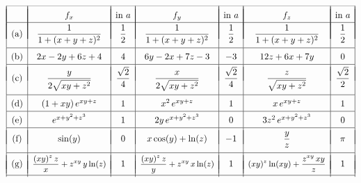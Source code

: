 \begin{Answer}\\
    \vspace{-0.65cm}
    $\renewcommand{\arraystretch}{1.5}\begin{array}{|c|c|c|c|c|c|c|}
    &&&&&&\vspace{-0.77cm}\\
    \hline
    &&&&&&\vspace{-0.6cm}\\
    & f_x & \mbox{in } a  & f_y & \mbox{in } a & f_z & \mbox{in } a   \\
    &&&&&&\vspace{-0.65cm}\\
    \hline
    &&&&&&\vspace{-0.55cm}\\
    \mbox{(a)} & \dfrac{1}{1+(x+y+z)^2} & \dfrac{1}{2} & \dfrac{1}{1+(x+y+z)^2} & \dfrac{1}{2}  & \dfrac{1}{1+(x+y+z)^2} & \dfrac{1}{2} \\[0.25cm]
    \hline
    \mbox{(b)} & 2x-2y+6z+4 & 4 & 6y-2x+7z-3 & -3  & 12z+6x+7y & 0  \\ 
    \hline
    &&&&&&\vspace{-0.55cm}\\
    \mbox{(c)} & \dfrac{y}{2\sqrt{xy+z^2}} & \dfrac{\sqrt{2}}{4} & \dfrac{x}{2\sqrt{xy+z^2}} & \dfrac{\sqrt{2}}{4}   & \dfrac{z}{\sqrt{xy+z^2}} & \dfrac{\sqrt{2}}{2}  \\[0.35cm] 
    \hline
    \mbox{(d)} & \left(1+xy\right)e^{xy+z} & 1 & x^2\,e^{xy+z} & 1  & x\, e^{xy+z} & 1  \\
    \hline
    \mbox{(e)} & e^{x+y^2+z^3} & 1 & 2y\,e^{x+y^2+z^3} & 0  & 3z^2\,e^{x+y^2+z^3} & 0  \\ 
    \hline
    &&&&&&\vspace{-0.55cm}\\
    \mbox{(f)} & \sin (y) & 0 & x\cos (y) + \ln (z) & -1 & \dfrac{y}{z} & \pi  \\[0.25cm] 
    \hline
    &&&&&&\vspace{-0.55cm}\\
    \mbox{(g)} & \mbox{\begin{small}$\dfrac{(xy)^z\,z}{x}+z^{xy}\,y\ln (z)$\end{small}} & 1 & \mbox{\begin{small}$\dfrac{(xy)^z\,z}{y}+z^{xy}\,x\ln (z)$\end{small}} & 1 & \mbox{\begin{small}$(xy)^z\ln (xy) + \dfrac{z^{xy}\,xy}{z}$\end{small}} & 1  \vspace{-0.5cm} \\
    &&&&&&\vspace{-0.07cm}\\
    \hline
    \end{array}$
    

\end{Answer}
